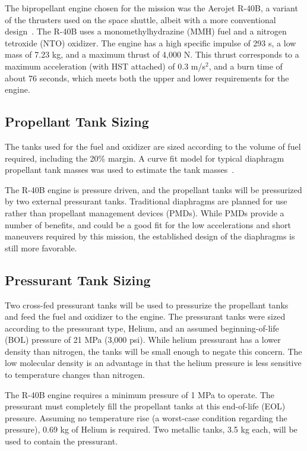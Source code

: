 \documentclass[paper=letter, fontsize=11pt]{scrartcl} %
\numberwithin{equation}{section} %
\numberwithin{figure}{section} %
\numberwithin{table}{section} %
\begin{document}
The bipropellant engine chosen for the mission was the Aerojet R-40B, a variant of the thrusters used on the space shuttle, albeit with a more conventional design~\cite{biprop}. The R-40B uses a monomethylhydrazine (MMH) fuel and a nitrogen tetroxide (NTO) oxidizer. The engine has a high specific impulse of 293 s, a low mass of 7.23 kg, and a maximum thrust of 4,000 N. This thrust corresponds to a maximum acceleration (with HST attached) of 0.3 m/s$^2$, and a burn time of about 76 seconds, which meets both the upper and lower requirements for the engine.

\subsection{Propellant Tank Sizing}

The tanks used for the fuel and oxidizer are sized according to the volume of fuel required, including the 20\% margin. A curve fit model for typical diaphragm propellant tank masses was used to estimate the tank masses~\cite{ref12_8}.

The R-40B engine is pressure driven, and the propellant tanks will be pressurized by two external pressurant tanks. Traditional diaphragms are planned for use rather than propellant management devices (PMDs). While PMDs provide a number of benefits, and could be a good fit for the low accelerations and short maneuvers required by this mission, the established design of the diaphragms is still more favorable.

\subsection{Pressurant Tank Sizing}

Two cross-fed pressurant tanks will be used to pressurize the propellant tanks and feed the fuel and oxidizer to the engine. The pressurant tanks were sized according to the pressurant type, Helium, and an assumed beginning-of-life (BOL) pressure of 21 MPa (3,000 psi). While helium pressurant has a lower density than nitrogen, the tanks will be small enough to negate this concern. The low molecular density is an advantage in that the helium pressure is less sensitive to temperature changes than nitrogen.

The R-40B engine requires a minimum pressure of 1 MPa to operate. The pressurant must completely fill the propellant tanks at this end-of-life (EOL) pressure. Assuming no temperature rise (a worst-case condition regarding the pressure), 0.69 kg of Helium is required. Two metallic tanks, 3.5 kg each, will be used to contain the pressurant.
\end{document}

